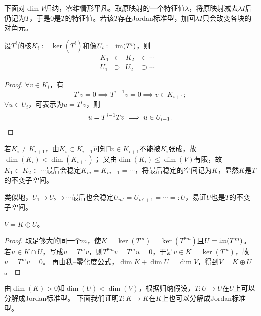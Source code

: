 \begin{remark}
	下面对$\dim V$归纳，零维情形平凡。取原映射的一个特征值$\lambda$，将原映射减去$\lambda I$后仍记为$T$，于是$0$是$T$的特征值。若该$T$存在Jordan标准型，加回$\lambda I$只会改变各块的对角元。
\end{remark}

\begin{theorem}{}{}
	设$T^i$的核$K_i := \ker(T^i)$和像$U_i := \operatorname{im}(T^i)$，则
	\begin{subequations}\label{eq:la-kernel-image-filtrations}
		\begin{alignat}{4}
			K_1 &\subset {}&K_2 &\subset \cdots&\\
			U_1 &\supset {}&U_2 &\supset \cdots&
		\end{alignat}
	\end{subequations}
\end{theorem}

\begin{proof}
	$\forall v \in K_i$，有
	\[
		T^iv = 0 \implies T^{i+1}v = 0 \implies v \in K_{i+1};
	\]
	$\forall u \in U_i$，可表示为$u = T^iv$，则
	\[
		u = T^{i-1}Tv \implies u \in U_{i-1}.
		\qedhere
	\]
\end{proof} 

\begin{corollary}
	若$K_i \neq K_{i+1}$，由$K_i \subset K_{i+1}$可知$\exists v \in K_{i+1}$不能被$K_i$张成，故$\dim(K_i) < \dim(K_{i+1})$；
	又由$\dim(K_i) \leq \dim(V)$有限，故$K_1 \subset K_2 \subset \cdots$最后会稳定$K_m = K_{m+1} = \cdots$，将最后稳定的空间记为$K$，显然$K$是$T$的不变子空间。

	类似地，$U_1 \supset U_2 \supset \cdots$最后也会稳定$U_{m'} = U_{m'+1} = \cdots =: U$，易证$U$也是$T$的不变子空间。
\end{corollary}

\begin{theorem}
	{}{}
	$V = K \oplus U$。
\end{theorem}

\begin{proof}
    取足够大的同一个$m$，使$K = \ker(T^m) = \ker(T^{2m})$且$U = \operatorname{im}(T^m)$。若$u \in K \cap U$，写成$u = T^mv$，则$T^{2m}v = T^mu = 0$，于是$v \in K = \ker(T^m)$，故$u = T^mv = 0$。
    再由秩--零化度公式，$\dim K + \dim U = \dim V$，得到$V = K \oplus U$。
\end{proof}

\begin{corollary}
	由$\dim(K) > 0$知$\dim(U) < \dim(V)$，根据归纳假设，$T:U \to U$在$U$上可以分解成Jordan标准型。
	下面我们证明$T:K \to K$在$K$上也可以分解成Jordan标准型。
\end{corollary}

